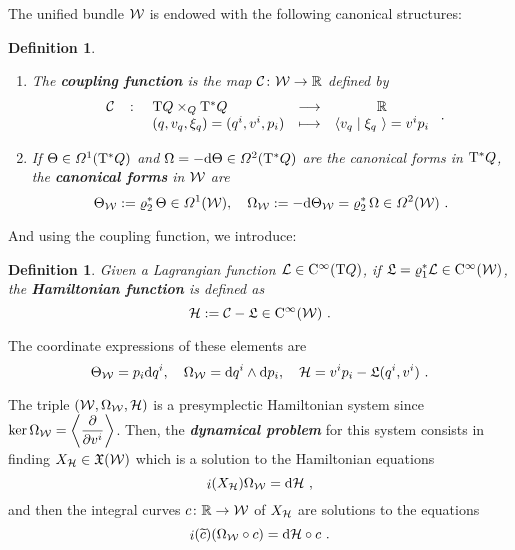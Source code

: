 \documentclass[12pt]{report}
\newtheorem{definition}[teor]{Definition}
\def\ben{\begin{enumerate}}
\def\een{\end{enumerate}}
\def\dst{\displaystyle}
\def\derpar#1#2{\frac{\partial{#1}}{\partial{#2}}}
\def\vf{\mathfrak X}
\def\df{{\mit\Omega}}
\def\Lag{{\cal L}}
\def\d{{\rm d}}
\def\Real{\mathbb{R}}
\def\Tan{{\rm T}}
\def\inn{\mathop{i}\nolimits}
\def\Cinfty{{\rm C}^\infty}
\begin{document}
The unified bundle ${\cal W}$ is endowed with the following canonical structures:

\begin{definition}
\ben
\item
The {\sl \textbf{coupling function}} is the
map ${\cal C}\colon{\cal W}\to\Real$  defined by
$$
\begin{array}{rclcc} 
{\cal C} &\colon& \Tan Q \times_Q\Tan^*Q & \longrightarrow & \Real \\ 
& &(q,v_q,\xi_q)=(q^i,v^i,p_i)& \longmapsto & \langle v_q \mid \xi_q\ \rangle=v^ip_i
 \end{array} \ .
$$
\item
If $\Theta\in\df^1(\Tan^*Q)$ and $\Omega=-\d\Theta\in\df^2(\Tan^*Q)$
are the canonical forms in $\Tan^*Q$,
the \textbf{canonical forms} in ${\cal W}$ are  
$$
\Theta_{\cal W}:=\varrho_2^*\,\Theta\in\df^1({\cal W}) ,\quad
\Omega_{\cal W}:=-\d\Theta_{\cal W}=\varrho_2^*\,\Omega\in\df^2({\cal W}) \ .
$$
\een
\end{definition}

And using the coupling function, we introduce:

\begin{definition}
Given a Lagrangian function $\Lag\in\Cinfty(\Tan Q)$, if
${\mathfrak L}=\varrho_1^*\Lag\in\Cinfty({\cal W})$, the \textbf{Hamiltonian function} is defined as
$$
{\cal H}:={\cal C}-{\mathfrak L}\in\Cinfty({\cal W}) \ .
$$
\end{definition}

The coordinate expressions of these elements are
$$
\Theta_{\cal W}=p_i\d q^i ,\quad
\Omega_{\cal W}=\d q^i\wedge\d p_i,\quad
{\cal H}=v^ip_i-{\mathfrak L}(q^i,v^i) \ .
$$

The triple $({\cal W},\Omega_{\cal W},{\cal H})$
is a presymplectic Hamiltonian system since
$\dst\ker\Omega_{\cal W}=\left\langle\derpar{}{v^i}\right\rangle$.
Then, the {\sl\textbf{dynamical problem}} for this system consists in finding $X_{\cal H}\in\vf({\cal W})$
which is a solution to the Hamiltonian equations
\begin{equation}
\label{Whamilton-contact-eqs0}
\inn(X_{\cal H})\Omega_{\cal W}=\d{\cal H} \ ,
\end{equation}
and then the integral curves $c\colon\Real\to{\cal W}$
 of $X_{\cal H}$ are solutions to the equations
\begin{equation}
\label{Whamilton-contact-eqs0b}
\inn(\widetilde c)(\Omega_{\cal W}\circ c)=\d{\cal H}\circ c \ .
\end{equation}
\end{document}
